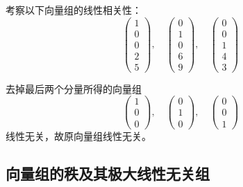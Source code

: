 \begin{frame}
  \begin{li}
    考察以下向量组的线性相关性：
    $$
    \left(
      \begin{array}{c}
        1\\
        0\\
        0\\
        2\\
        5
      \end{array}
    \right), \quad
    \left(
      \begin{array}{c}
        0\\
        1\\
        0\\
        6\\
        9
      \end{array}
    \right), \quad
    \left(
      \begin{array}{c}
        0\\
        0\\
        1\\
        4\\
        3
      \end{array}
    \right)
    $$
  \end{li} \pause 
  \begin{jie}
    去掉最后两个分量所得的向量组
    $$
    \left(
      \begin{array}{c}
        1\\
        0\\
        0
      \end{array}
    \right), \quad
    \left(
      \begin{array}{c}
        0\\
        1\\
        0
      \end{array}
    \right), \quad
    \left(
      \begin{array}{c}
        0\\
        0\\
        1
      \end{array}
    \right)
    $$
    线性无关，故原向量组线性无关。
  \end{jie}
\end{frame}


\subsection{向量组的秩及其极大线性无关组}

